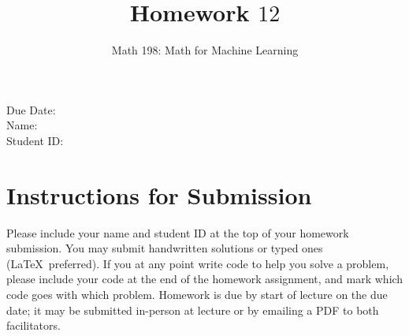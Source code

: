 \documentclass{article}
\title{Homework $12$}
\author{Math 198: Math for Machine Learning}
\date{}
\begin{document}
\maketitle

\noindent
Due Date:  \\
Name: \\
Student ID:

\section*{Instructions for Submission}
Please include your name and student ID at the top of your homework submission. You may submit handwritten solutions or typed ones (\LaTeX\ preferred). If you at any point write code to help you solve a problem, please include your code at the end of the homework assignment, and mark which code goes with which problem. Homework is due by start of lecture on the due date; it may be submitted in-person at lecture or by emailing a PDF to both facilitators.
\end{document}
